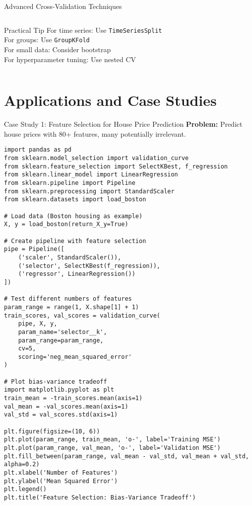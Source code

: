 \documentclass[aspectratio=169,11pt]{beamer}
\begin{document}
\begin{frame}{Advanced Cross-Validation Techniques}
\begin{columns}
\begin{column}{0.5\textwidth}
\begin{alertblock}{Practical Tip}
For time series: Use \texttt{TimeSeriesSplit}\\
For groups: Use \texttt{GroupKFold}\\
For small data: Consider bootstrap\\
For hyperparameter tuning: Use nested CV
\end{alertblock}
\end{column}
\end{columns}
\end{frame}

\section{Applications and Case Studies}

\begin{frame}[fragile]{Case Study 1: Feature Selection for House Price Prediction}
\textbf{Problem:} Predict house prices with 80+ features, many potentially irrelevant.

\begin{lstlisting}[basicstyle=\ttfamily\tiny]
import pandas as pd
from sklearn.model_selection import validation_curve
from sklearn.feature_selection import SelectKBest, f_regression
from sklearn.linear_model import LinearRegression
from sklearn.pipeline import Pipeline
from sklearn.preprocessing import StandardScaler
from sklearn.datasets import load_boston

# Load data (Boston housing as example)
X, y = load_boston(return_X_y=True)

# Create pipeline with feature selection
pipe = Pipeline([
    ('scaler', StandardScaler()),
    ('selector', SelectKBest(f_regression)),
    ('regressor', LinearRegression())
])

# Test different numbers of features
param_range = range(1, X.shape[1] + 1)
train_scores, val_scores = validation_curve(
    pipe, X, y,
    param_name='selector__k',
    param_range=param_range,
    cv=5,
    scoring='neg_mean_squared_error'
)

# Plot bias-variance tradeoff
import matplotlib.pyplot as plt
train_mean = -train_scores.mean(axis=1)
val_mean = -val_scores.mean(axis=1)
val_std = val_scores.std(axis=1)

plt.figure(figsize=(10, 6))
plt.plot(param_range, train_mean, 'o-', label='Training MSE')
plt.plot(param_range, val_mean, 'o-', label='Validation MSE')
plt.fill_between(param_range, val_mean - val_std, val_mean + val_std, alpha=0.2)
plt.xlabel('Number of Features')
plt.ylabel('Mean Squared Error')
plt.legend()
plt.title('Feature Selection: Bias-Variance Tradeoff')
\end{lstlisting}
\end{frame}
\end{document}
